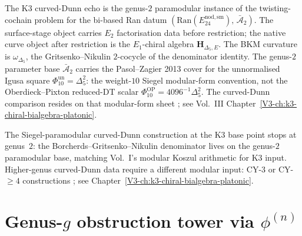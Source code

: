 \begin{remark}
\label{rem:cdhg-1}
The K3 curved-Dunn echo is the genus-$2$ paramodular instance of
the twisting-cochain problem for the bi-based Ran datum
$(\mathrm{Ran}(E^{\mathrm{nod,sm}}_{24}),\,\bar{\mathcal A}_2)$.
The surface-stage object carries $E_2$ factorisation data before
restriction; the native curve object after restriction is the
$E_1$-chiral algebra $\mathbf H_{\Delta_5,E}$. The BKM curvature
is $\omega_{\Delta_5}$, the Gritsenko--Nikulin $2$-cocycle of the
denominator identity. The genus-$2$ parameter base
$\bar{\mathcal A}_2$ carries the Pasol--Zagier 2013 cover for the
unnormalised Igusa square $\Phi_{10}^{\mathrm{un}}=\Delta_5^2$:
the weight-$10$ Siegel modular-form convention, not the
Oberdieck--Pixton reduced-DT scalar
$\Phi_{10}^{\mathrm{OP}}=4096^{-1}\Delta_5^2$. The curved-Dunn
comparison resides on that modular-form sheet
\cite{GritsenkoNikulin1998,Borcherds1992,PasolZagier2013}; see
Vol.~III Chapter~\ref{V3-ch:k3-chiral-bialgebra-platonic}.
\end{remark}

\begin{remark}
\label{rem:cdhg-2}
The Siegel-paramodular curved-Dunn construction at the K3 base
point stops at genus~$2$: the Borcherds--Gritsenko--Nikulin
denominator lives on the genus-$2$ paramodular base, matching
Vol.~I's modular Koszul arithmetic for K3 input. Higher-genus
curved-Dunn data require a different modular input: CY-$3$ or
CY-$\geq4$ constructions
\cite{PiatetskiShapiroShafarevich1971,BailyBorel1966}; see
Chapter~\ref{V3-ch:k3-chiral-bialgebra-platonic}.
\end{remark}

\section{Genus-$g$ obstruction tower via $\phi^{(n)}$}
\label{sec:cdhg-supplement-ii}

